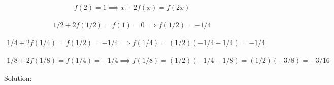 \begin{align*}
f(2) = 1 \implies x + 2f(x) = f(2x)
\end{align*}

\begin{align*}
1/2 + 2f(1/2) = f(1) = 0 
\implies f(1/2) = -1/4
\end{align*}

\begin{align*}
1/4 + 2f(1/4) = f(1/2) = -1/4 
\implies f(1/4) = (1/2)(-1/4-1/4) = -1/4
\end{align*}

\begin{align*}
1/8 + 2f(1/8) = f(1/4) = -1/4 
\implies f(1/8) = (1/2)(-1/4-1/8) = (1/2)(-3/8) = -3/16
\end{align*}

Solution: 
